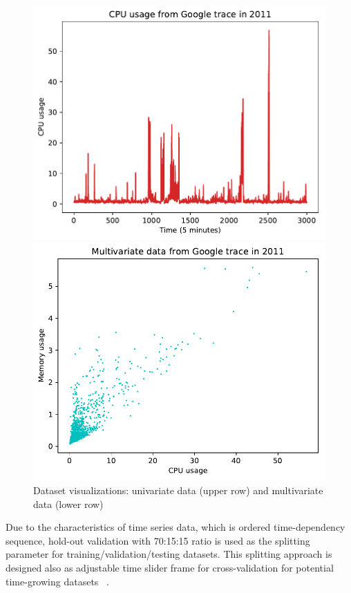 \documentclass[11pt,twoside]{article}
\begin{document}
\begin{multicols}{2}
\begin{figure}[!ht]
  \begin{minipage}[b]{0.48\linewidth}
    \centering
    \includegraphics[width=0.9\linewidth]{images/pdf/data/google_cpu_5m.pdf} 
  \end{minipage}%
  \begin{minipage}[b]{0.48\linewidth}
    \centering
    \includegraphics[width=0.89\linewidth]{images/pdf/data/cpu_ram.pdf} 
  \end{minipage} 
  
  \caption{Dataset visualizations: univariate data (upper row) and multivariate data (lower row)} 
  \label{dataset_visual} 
\end{figure}

Due to the characteristics of time series data, which is ordered time-dependency sequence, hold-out validation with 70:15:15 ratio is used as the splitting parameter for training/validation/testing datasets. This splitting approach is designed also as adjustable time slider frame for cross-validation for potential time-growing datasets~ \citep{bishop2006pattern, arlot2010survey}.


\end{multicols}
\end{document}
